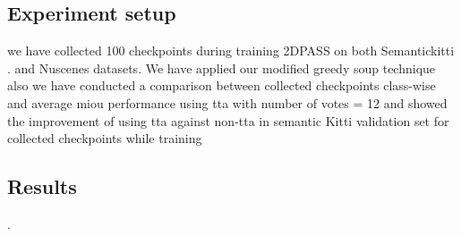 \documentclass[10pt,twocolumn,letterpaper]{article}
\begin{document}
\subsection{Experiment setup}
we have collected 100 checkpoints during training 2DPASS \cite{yan20222dpass} on both  Semantickitti \cite{behley2019semantickitti}. and Nuscenes \cite{caesar2020nuscenes}  datasets.
We have applied our modified greedy soup technique
also we have conducted a comparison between collected checkpoints  class-wise and average miou performance using tta with number of votes = 12 and showed the improvement of using tta against non-tta in semantic Kitti validation set for collected checkpoints while training   
\subsection{Results}.
\end{document}
